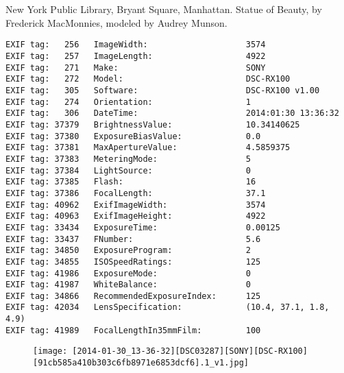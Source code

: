 \section{\protect{}}
\noindent New York Public Library, Bryant Square, Manhattan. Statue of Beauty, by Frederick MacMonnies, modeled by Audrey Munson.
\noindent
\begin{lstlisting}
EXIF tag:   256   ImageWidth:                    3574
EXIF tag:   257   ImageLength:                   4922
EXIF tag:   271   Make:                          SONY
EXIF tag:   272   Model:                         DSC-RX100
EXIF tag:   305   Software:                      DSC-RX100 v1.00
EXIF tag:   274   Orientation:                   1
EXIF tag:   306   DateTime:                      2014:01:30 13:36:32
EXIF tag: 37379   BrightnessValue:               10.34140625
EXIF tag: 37380   ExposureBiasValue:             0.0
EXIF tag: 37381   MaxApertureValue:              4.5859375
EXIF tag: 37383   MeteringMode:                  5
EXIF tag: 37384   LightSource:                   0
EXIF tag: 37385   Flash:                         16
EXIF tag: 37386   FocalLength:                   37.1
EXIF tag: 40962   ExifImageWidth:                3574
EXIF tag: 40963   ExifImageHeight:               4922
EXIF tag: 33434   ExposureTime:                  0.00125
EXIF tag: 33437   FNumber:                       5.6
EXIF tag: 34850   ExposureProgram:               2
EXIF tag: 34855   ISOSpeedRatings:               125
EXIF tag: 41986   ExposureMode:                  0
EXIF tag: 41987   WhiteBalance:                  0
EXIF tag: 34866   RecommendedExposureIndex:      125
EXIF tag: 42034   LensSpecification:             (10.4, 37.1, 1.8, 4.9)
EXIF tag: 41989   FocalLengthIn35mmFilm:         100

\end{lstlisting}
\clearpage
\begin{figure}
\raggedleft
\texttt{[image: [2014-01-30\_13-36-32][DSC03287][SONY][DSC-RX100][91cb585a410b303c6fb8971e6853dcf6].1\_v1.jpg]}
\end{figure}


\clearpage
